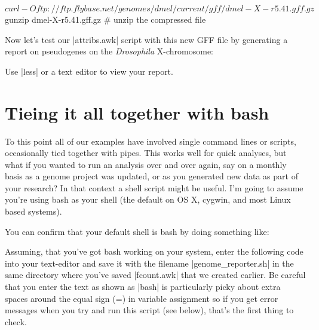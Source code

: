 \begin{bash}
$ curl -O ftp://ftp.flybase.net/genomes/dmel/current/gff/dmel-X-r5.41.gff.gz   
$ gunzip dmel-X-r5.41.gff.gz  # unzip the compressed file
\end{bash}

Now let's test our |attribs.awk| script with this new GFF file by generating a report on pseudogenes on the \textit{Drosophila} X-chromosome:


Use |less| or a text editor to view your report.

\section{Tieing it all together with bash}

To this point all of our examples have involved single command lines or scripts, occasionally tied together with pipes.  This works well for quick analyses, but what if you wanted to run an analysis over and over again, say on a monthly basis as a genome project was updated, or as you generated new data as part of your research?  In that context a shell script might be useful. I'm going to assume you're using bash as your shell (the default on OS X, cygwin, and most Linux based systems).

You can confirm that your default shell is bash by doing something like:

Assuming, that you've got bash working on your system, enter the following code into your text-editor and save it with the filename |genome_reporter.sh| in the same directory where you've saved |fcount.awk| that we created earlier. Be careful that you enter the text as shown as |bash| is particularly picky about extra spaces around the equal sign (=) in variable assignment so if you get error messages when you try and run this script (see below), that's the first thing to check.

